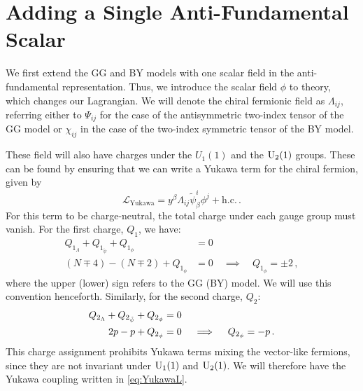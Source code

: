 \section{Adding a Single Anti-Fundamental Scalar} \label{sec:fundscalar}
We first extend the GG and BY models with one scalar field in the anti-fundamental representation. Thus, we introduce the scalar field $\phi$ to theory, which changes our Lagrangian. We will denote the chiral fermionic field as $\Lambda_{ij}$, referring either to $\Psi_{ij}$ for the case of the antisymmetric two-index tensor of the GG model or $\chi_{ij}$ in the case of the two-index symmetric tensor of the BY model. 

These field will also have charges under the $U_1(1)$ and the $\mathrm{U}_2(1)$ groups. These can be found by ensuring that we can write a Yukawa term for the chiral fermion, given by
\begin{equation}
    \mathcal{L}_{\text{Yukawa}}= y^\beta\Lambda_{ij} \tilde\psi ^{i}_{\beta} \phi^j + \mathrm{h.c.}\,.\label{eq:YukawaL}
\end{equation}
For this term to be charge-neutral, the total charge under each gauge group must vanish. For the first charge, $Q_1$, we have:
\begin{align}
     Q_{1_\Lambda} + Q_{1_{\tilde{\psi}}} + Q_{1_\phi} &= 0  \\
     (N \mp 4) - (N \mp 2) + Q_{1_\phi} &= 0 \quad \implies \quad Q_{1_\phi} = \pm 2 \,,
\end{align}
where the upper (lower) sign refers to the GG (BY) model. We will use this convention henceforth. Similarly, for the second charge, $Q_2$:
\begin{align}
     Q_{2_\Lambda} + Q_{2_{\tilde{\psi}}} + Q_{2_\phi} &= 0 \notag \\
     2p - p + Q_{2_\phi} &= 0 \quad \implies \quad Q_{2_\phi} = -p \,.
\end{align}
This charge assignment prohibits Yukawa terms mixing the vector-like fermions, since they are not invariant under $\mathrm{U}_1(1)$ and $\mathrm{U}_2(1)$. We will therefore have the Yukawa coupling written in \eqref{eq:YukawaL}.

